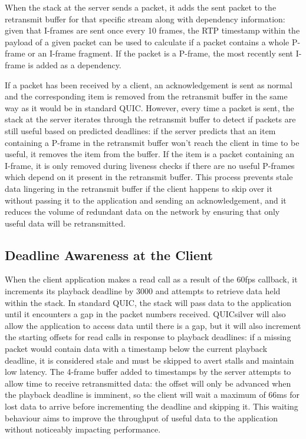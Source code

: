 \documentclass{mpaper}
\begin{document}
When the stack at the server sends a packet, it adds the sent packet to the retransmit buffer for that specific stream along with dependency information: given that I-frames are sent once every 10 frames, the RTP timestamp within the payload of a given packet can be used to calculate if a packet contains a whole P-frame or an I-frame fragment. If the packet is a P-frame, the most recently sent I-frame is added as a dependency.

If a packet has been received by a client, an acknowledgement is sent as normal and the corresponding item is removed from the retransmit buffer in the same way as it would be in standard QUIC. However, every time a packet is sent, the stack at the server iterates through the retransmit buffer to detect if packets are still useful based on predicted deadlines: if the server predicts that an item containing a P-frame in the retransmit buffer won't reach the client in time to be useful, it removes the item from the buffer. If the item is a packet containing an I-frame, it is only removed during liveness checks if there are no useful P-frames which depend on it present in the retransmit buffer. This process prevents stale data lingering in the retransmit buffer if the client happens to skip over it without passing it to the application and sending an acknowledgement, and it reduces the volume of redundant data on the network by ensuring that only useful data will be retransmitted.

\subsection{Deadline Awareness at the Client}

When the client application makes a read call as a result of the 60fps callback, it increments its playback deadline by 3000 and attempts to retrieve data held within the stack. In standard QUIC, the stack will pass data to the application until it encounters a gap in the packet numbers received. QUICsilver will also allow the application to access data until there is a gap, but it will also increment the starting offsets for read calls in response to playback deadlines: if a missing packet would contain data with a timestamp below the current playback deadline, it is considered stale and must be skipped to avert stalls and maintain low latency. The 4-frame buffer added to timestamps by the server attempts to allow time to receive retransmitted data: the offset will only be advanced when the playback deadline is imminent, so the client will wait a maximum of 66ms for lost data to arrive before incrementing the deadline and skipping it. This waiting behaviour aims to improve the throughput of useful data to the application without noticeably impacting performance.
\end{document}
